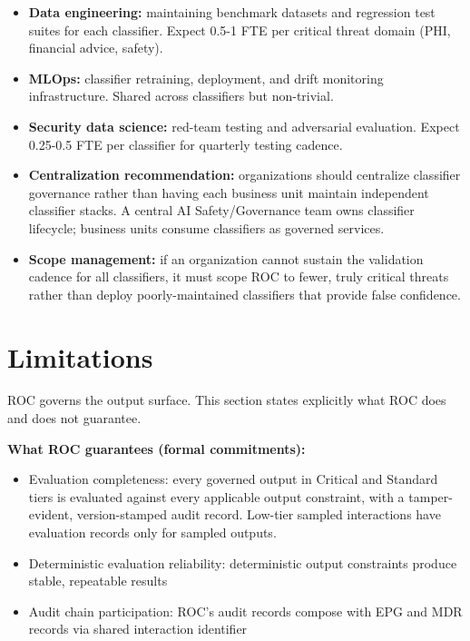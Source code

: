\begin{itemize}
  \item \textbf{Data engineering:} maintaining benchmark datasets and regression test suites for each classifier. Expect 0.5-1 FTE per critical threat domain (PHI, financial advice, safety).
  \item \textbf{MLOps:} classifier retraining, deployment, and drift monitoring infrastructure. Shared across classifiers but non-trivial.
  \item \textbf{Security data science:} red-team testing and adversarial evaluation. Expect 0.25-0.5 FTE per classifier for quarterly testing cadence.
  \item \textbf{Centralization recommendation:} organizations should centralize classifier governance rather than having each business unit maintain independent classifier stacks. A central AI Safety/Governance team owns classifier lifecycle; business units consume classifiers as governed services.
  \item \textbf{Scope management:} if an organization cannot sustain the validation cadence for all classifiers, it must scope ROC to fewer, truly critical threats rather than deploy poorly-maintained classifiers that provide false confidence.
\end{itemize}




\section{Limitations}
\label{sec:controls-9}


ROC governs the output surface. This section states explicitly what ROC does and does not guarantee.

\textbf{What ROC guarantees (formal commitments):}

\begin{itemize}
  \item Evaluation completeness: every governed output in Critical and Standard tiers is evaluated against every applicable output constraint, with a tamper-evident, version-stamped audit record. Low-tier sampled interactions have evaluation records only for sampled outputs.
  \item Deterministic evaluation reliability: deterministic output constraints produce stable, repeatable results
  \item Audit chain participation: ROC's audit records compose with EPG and MDR records via shared interaction identifier
\end{itemize}


